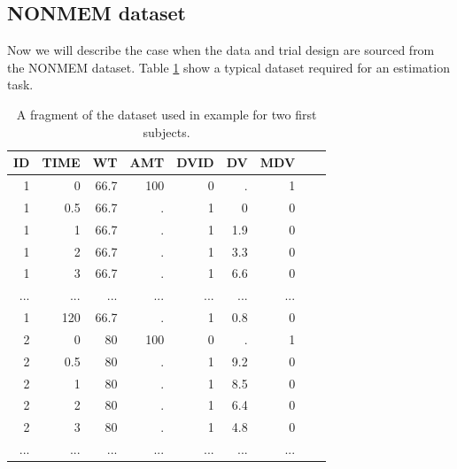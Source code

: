 \subsection{NONMEM dataset}
\label{sec:eg3-NONMEMdataset}
Now we will describe the case when the data and trial design are sourced from the 
NONMEM dataset. Table \ref{tab:example3_dataSet} show a typical dataset required for 
an estimation task.
\begin{table}[htdp]
\begin{center}
\small
\begin{tabular}{rrrrrrrrr}\toprule
ID	& TIME	& WT	& AMT	& DVID	& DV		& MDV  \\\midrule
1	& 0		& 66.7	& 100	& 0		& .		& 1  \\
1	& 0.5	& 66.7	& .		& 1		& 0		& 0  \\
1	& 1		& 66.7	& .		& 1		& 1.9	& 0  \\
1	& 2		& 66.7	& .		& 1		& 3.3	& 0  \\
1	& 3		& 66.7	& .		& 1		& 6.6	& 0  \\
...	& ...		& ...		&...		& ...		& ...		& ... \\
1	& 120	& 66.7	& .		& 1		& 0.8	& 0  \\
2	& 0		& 80 	& 100	& 0		& .		& 1 \\
2	& 0.5	& 80 	& .		& 1		& 9.2	& 0 \\
2	& 1		& 80		& .		& 1		& 8.5	& 0 \\
2	& 2		& 80		& .		& 1		& 6.4	& 0 \\
2	& 3		& 80		& .		& 1		& 4.8	& 0 \\
...	& ...		& ...		& ...		& ...		& ...		& ... \\ \bottomrule
\end{tabular}
\end{center}
\caption{A fragment of the dataset used in example \theexamples\; for two first subjects.}
\label{tab:example3_dataSet}
\end{table}%

